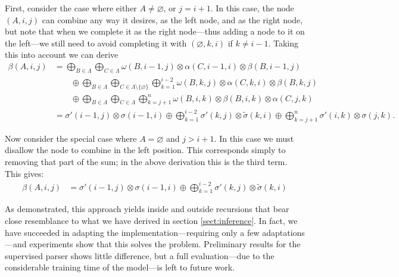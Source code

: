     First, consider the case where either $A \neq \varnothing$, or $j = i + 1$. In this case, the node $(A, i, j)$ can combine any way it desires, as the left node, and as the right node, but note that when we complete it as the right node---thus adding a node to it on the left---we still need to avoid completing it with $(\varnothing, k, i)$ if $k \neq i-1$. Taking this into account we can derive
    \begin{align}
      \label{eq:outside-pruned}
      \beta(A, i, j)
        &= \bigoplus_{B \in \Lambda} \bigoplus_{C \in \Lambda}  \omega(B, i-1, j) \otimes \alpha(C, i-1, i) \otimes \beta(B, i-1, j)  \\
          &\qquad \oplus \bigoplus_{B \in \Lambda} \bigoplus_{C \in \Lambda \setminus \{ \varnothing \}} \bigoplus_{k=1}^{i-2} \omega(B, k, j) \otimes \alpha(C, k, i) \otimes \beta(B, k, j) \\
          &\qquad \oplus \bigoplus_{B \in \Lambda} \bigoplus_{C \in \Lambda} \bigoplus_{k=j+1}^{n} \omega(B, i, k) \otimes \beta(B, i, k) \otimes \alpha(C, j, k)  \\
        &= \sigma'(i-1, j) \otimes \sigma(i-1, i) \oplus \bigoplus_{k=1}^{i-2} \sigma'(k, j) \otimes \tilde{\sigma}(k, i) \oplus \bigoplus_{k=j+1}^{n} \sigma'(i, k) \otimes \sigma(j, k).
    \end{align}

    Now consider the special case where $ A = \varnothing$ and $j > i + 1$. In this case we must disallow the node to combine in the left position. This corresponds simply to removing that part of the sum; in the above derivation this is the third term. This gives:
    \begin{align}
      \beta(A, i, j) &=
        \sigma'(i-1, j) \otimes \sigma(i-1, i) \oplus \displaystyle\bigoplus_{k=1}^{i-2} \sigma'(k, j) \otimes \tilde{\sigma}(k, i)
    \end{align}

    As demonstrated, this approach yields inside and outside recursions that bear close resemblance to what we have derived in section \ref{sect:inference}. In fact, we have succeeded in adapting the implementation---requiring only a few adaptations---and experiments show that this solves the problem. Preliminary results for the supervised parser shows little difference, but a full evaluation---due to the considerable training time of the model---is left to future work.

